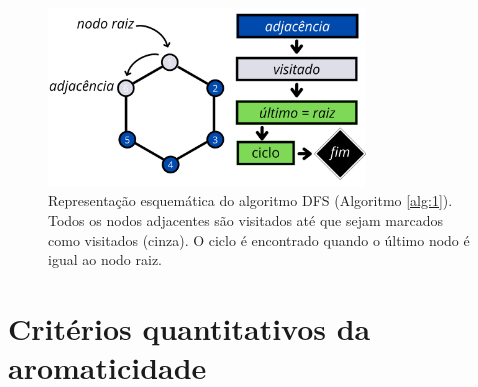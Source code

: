 \begin{figure}[htb]
\caption{\label{fig:DFS} Representação esquemática do algoritmo DFS (Algoritmo \ref{alg:1}). Todos os nodos adjacentes são visitados até que sejam marcados como visitados (cinza). O ciclo é encontrado quando o último nodo é igual ao nodo raiz.}
	\begin{center}
		\includegraphics[width=0.75\textwidth]{images/DFS.png}
	\end{center}
\end{figure}

\section{Critérios quantitativos da aromaticidade}